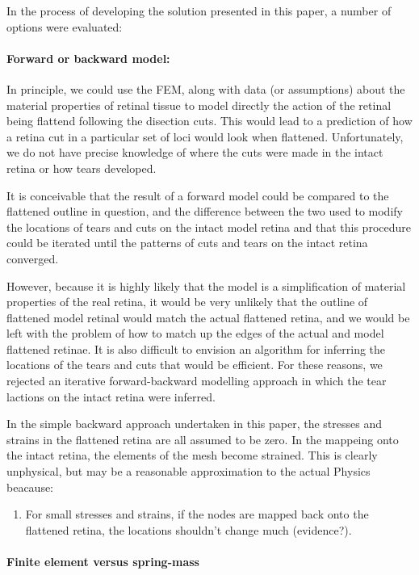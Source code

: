 \documentclass{article}
\begin{document}
In the process of developing the solution presented in this paper, a
number of options were evaluated:

\paragraph{Forward or backward model:} 

In principle, we could use the FEM, along with data (or assumptions)
about the material properties of retinal tissue to model directly the
action of the retinal being flattend following the disection
cuts. This would lead to a prediction of how a retina cut in a
particular set of loci would look when flattened. Unfortunately, we do
not have precise knowledge of where the cuts were made in the intact
retina or how tears developed.

It is conceivable that the result of a forward model could be compared
to the flattened outline in question, and the difference between the
two used to modify the locations of tears and cuts on the intact model
retina and that this procedure could be iterated until the patterns of
cuts and tears on the intact retina converged.

However, because it is highly likely that the model is a
simplification of material properties of the real retina, it would be
very unlikely that the outline of flattened model retinal would match
the actual flattened retina, and we would be left with the problem of
how to match up the edges of the actual and model flattened
retinae. It is also difficult to envision an algorithm for inferring
the locations of the tears and cuts that would be efficient. For these
reasons, we rejected an iterative forward-backward modelling approach
in which the tear lactions on the intact retina were inferred.

In the simple backward approach undertaken in this paper, the stresses
and strains in the flattened retina are all assumed to be zero. In the
mappeing onto the intact retina, the elements of the mesh become
strained. This is clearly unphysical, but may be a reasonable
approximation to the actual Physics beacause:
\begin{enumerate}
\item For small stresses and strains, if the nodes are mapped back
  onto the flattened retina, the locations shouldn't change much
  (evidence?).
\end{enumerate}

\paragraph{Finite element versus spring-mass}
\label{fold-sphere:sec:finite-elem-vers}
\end{document}
